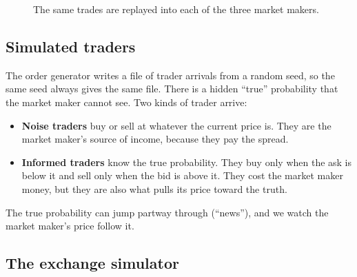 \documentclass[11pt]{article}
\begin{document}
\begin{figure}[h]
\centering
{}
\caption{The same trades are replayed into each of the three market makers.}
\end{figure}

\subsection{Simulated traders}

The order generator writes a file of trader arrivals from a random seed, so
the same seed always gives the same file. There is a hidden ``true''
probability that the market maker cannot see. Two kinds of trader arrive:

\begin{itemize}
  \item \textbf{Noise traders} buy or sell at whatever the current price is.
        They are the market maker's source of income, because they pay the
        spread.
  \item \textbf{Informed traders} know the true probability. They buy only
        when the ask is below it and sell only when the bid is above it. They
        cost the market maker money, but they are also what pulls its price
        toward the truth.
\end{itemize}

The true probability can jump partway through (``news''), and we watch the
market maker's price follow it.

\subsection{The exchange simulator}
\end{document}
